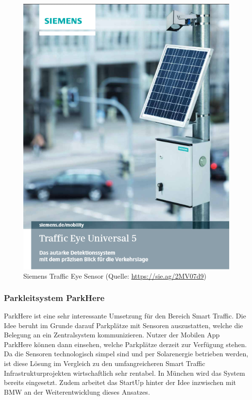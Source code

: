 \begin{figure}[ht]
\begin{center}
\includegraphics[scale=0.3]{images/SiemensTrafficEyeSensor.png}
	\caption{Siemens Traffic Eye Sensor (Quelle: \url{https://sie.ag/2MV07d9})}
	\label{fig14}
\end{center}

\end{figure}

\subsubsection{Parkleitsystem ParkHere}
ParkHere ist eine sehr interessante Umsetzung für den Bereich Smart Traffic. Die Idee beruht im Grunde darauf Parkplätze mit Sensoren auszustatten, welche die Belegung an ein Zentralsystem kommunizieren. Nutzer der Mobilen App ParkHere können dann einsehen, welche Parkplätze derzeit zur Verfügung stehen. Da die Sensoren technologisch simpel sind und per Solarenergie betrieben werden, ist diese Lösung im Vergleich zu den umfangreicheren Smart Traffic Infrastrukturprojekten wirtschaftlich sehr rentabel. In München wird das System bereits eingesetzt. Zudem arbeitet das StartUp hinter der Idee inzwischen mit BMW an der Weiterentwicklung dieses Ansatzes.

